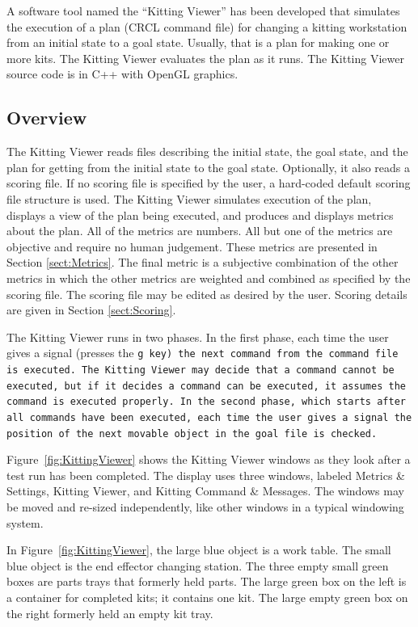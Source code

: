 A software tool named the ``Kitting Viewer'' has been developed that
simulates the execution of a plan (CRCL command file) for changing a
kitting workstation from an initial state to a goal state. Usually, that is
a plan for making one or more kits. The Kitting Viewer evaluates the plan
as it runs. The Kitting Viewer source code is in C++ with OpenGL graphics.

\subsection{Overview}

The Kitting Viewer reads files describing the initial state, the goal state,
and the plan for getting from the initial state to the goal state.
Optionally, it also reads a scoring file. If no scoring file is specified
by the user, a hard-coded default scoring file structure is used. The
Kitting Viewer simulates execution of the plan, displays a view of the plan
being executed, and produces and displays metrics about the plan. All of
the metrics are numbers. All but one of the metrics are objective and
require no human judgement. These metrics are presented in
Section \ref{sect:Metrics}. The final metric is a subjective combination of
the other metrics in which the other metrics are weighted and combined as
specified by the scoring file. The scoring file may be edited as desired by
the user. Scoring details are given in Section \ref{sect:Scoring}.

The Kitting Viewer runs in two phases. In the first phase, each time the
user gives a signal (presses the \tt g \rm key) the next command from the
command file is executed. The Kitting Viewer may decide that a command
cannot be executed, but if it decides a command can be executed, it assumes
the command is executed properly. In the second phase, which starts after
all commands have been executed, each time the user gives a signal the
position of the next movable object in the goal file is checked.

Figure~\ref{fig:KittingViewer} shows the Kitting Viewer windows as they look
after a test run has been completed. The display uses three windows,
labeled Metrics \& Settings, Kitting Viewer, and Kitting Command \&
Messages. The windows may be moved and re-sized independently, like other
windows in a typical windowing system.

In Figure~\ref{fig:KittingViewer}, the large blue object is a work table.
The small blue object is the end effector changing station. The three empty
small green boxes are parts trays that formerly held parts. The large green
box on the left is a container for completed kits; it contains one kit. The
large empty green box on the right formerly held an empty kit tray.

